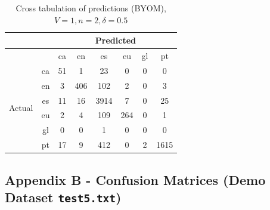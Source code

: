 \documentclass[runningheads]{llncs}
\newcommand{\code}[1]{\texttt{#1}}
\begin{document}
\begin{table}
	\centering
	\caption{Cross tabulation of predictions (BYOM), $V=1, n=2, \delta=0.5$}
	\begin{tabular}{|c|c|c|c|c|c|c|c|} \hline
		& & \multicolumn{6}{c|}{Predicted} \\ \hline
		& &  ca &   en &    es &   eu &  gl &    pt \\ \hline
		\multirow{6}{*}{Actual} & ca   &  51 &    1 &    23 &    0 &   0 &     0 \\
		& en   &   3 &  406 &   102 &    2 &   0 &     3 \\
		& es   &  11 &   16 &  3914 &    7 &   0 &    25 \\
		& eu   &   2 &    4 &   109 &  264 &   0 &     1 \\
		& gl   &   0 &    0 &     1 &    0 &   0 &     0 \\
		& pt   &  17 &    9 &   412 &    0 &   2 &  1615 \\ \hline
	\end{tabular}
\end{table}

\newpage

\subsection{Appendix B - Confusion Matrices (Demo Dataset \code{test5.txt})}
\end{document}
